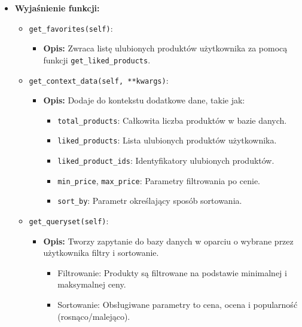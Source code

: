 \documentclass[12pt,a4paper,oneside]{article}
\theoremstyle{definition}
\numberwithin{equation}{section}
\begin{document}
\begin{itemize}
    \item \textbf{Wyjaśnienie funkcji:}
        \begin{itemize}
            \item \texttt{get\_favorites(self)}:
            \begin{itemize}
                \item \textbf{Opis:} Zwraca listę ulubionych produktów użytkownika za pomocą funkcji \texttt{get\_liked\_products}.
            \end{itemize}
            \item \texttt{get\_context\_data(self, **kwargs)}:
            \begin{itemize}
                \item \textbf{Opis:} Dodaje do kontekstu dodatkowe dane, takie jak:
                \begin{itemize}
                    \item \texttt{total\_products}: Całkowita liczba produktów w bazie danych.
                    \item \texttt{liked\_products}: Lista ulubionych produktów użytkownika.
                    \item \texttt{liked\_product\_ids}: Identyfikatory ulubionych produktów.
                    \item \texttt{min\_price}, \texttt{max\_price}: Parametry filtrowania po cenie.
                    \item \texttt{sort\_by}: Parametr określający sposób sortowania.
                \end{itemize}
            \end{itemize}
            \item \texttt{get\_queryset(self)}:
            \begin{itemize}
                \item \textbf{Opis:} Tworzy zapytanie do bazy danych w oparciu o wybrane przez użytkownika filtry i sortowanie.
                \begin{itemize}
                    \item Filtrowanie: Produkty są filtrowane na podstawie minimalnej i maksymalnej ceny.
                    \item Sortowanie: Obsługiwane parametry to cena, ocena i popularność (rosnąco/malejąco).
                \end{itemize}
            \end{itemize}
        \end{itemize}


\end{itemize}
\end{document}
